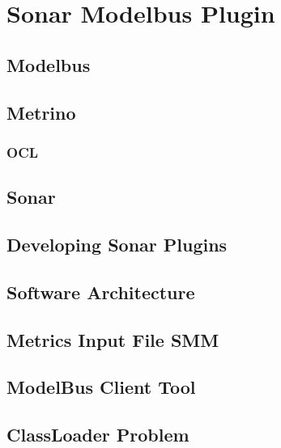 \chapter{Sonar Modelbus Plugin}
\section{Modelbus}

\section{Metrino}

\subsection{OCL}

\section{Sonar}

\section{Developing Sonar Plugins}

\section{Software Architecture}

\section{Metrics Input File SMM}

\section{ModelBus Client Tool}

\section{ClassLoader Problem}
